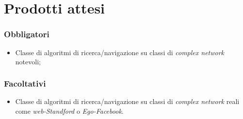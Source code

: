
\section{Prodotti attesi}
	\subsubsection*{Obbligatori}
	\begin{itemize}
		\item Classe di algoritmi di ricerca/navigazione su classi di \textit{complex network} notevoli;
	\end{itemize}
	
	
	\subsubsection*{Facoltativi}
	\begin{itemize}
		\item Classe di algoritmi di ricerca/navigazione su classi di \textit{complex network} reali come \textit{web-Standford} o \textit{Ego-Facebook}.
	\end{itemize} 
